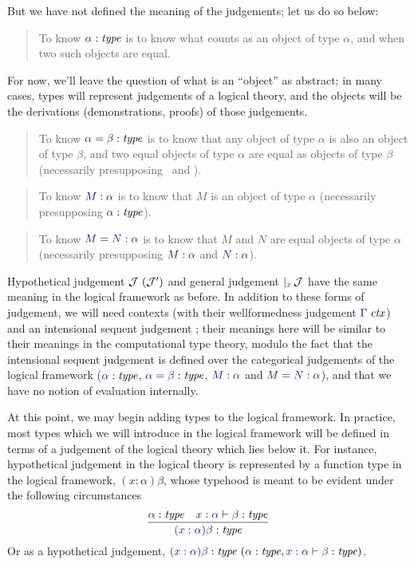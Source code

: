 \documentclass[main.tex]{subfiles}
\begin{document}
But we have not defined the meaning of the judgements; let us do so below:

\begin{quote}
  To know $\type\alpha$ is to know what counts as an object of type $\alpha$,
  and when two such objects are equal.
\end{quote}

For now, we'll leave the question of what is an ``object'' as
abstract; in many cases, types will represent judgements of a logical
theory, and the objects will be the derivations (demonstrations,
proofs) of those judgements.

\begin{quote}
  To know $\etype{\alpha}{\beta}$ is to know that any object of type $\alpha$ is
  also an object of type $\beta$, and two equal objects of type $\alpha$ are
  equal as objects of type $\beta$ (necessarily presupposing \type\alpha\ and
  \type\beta).
\end{quote}

\begin{quote}
  To know $\ofty{M}{\alpha}$ is to know that $M$ is an object of type $\alpha$
  (necessarily presupposing $\type\alpha$).
\end{quote}

\begin{quote}
  To know $\eofty{M}{N}{\alpha}$ is to know that $M$ and $N$ are equal objects of type
  $\alpha$ (necessarily presupposing $\ofty{M}{\alpha}$ and $\ofty{N}{\alpha}$).
\end{quote}

Hypothetical judgement $\mathcal{J}\ (\mathcal{J}')$ and general judgement
$\genj{x}{\mathcal{J}}$ have the same meaning in the logical framework as
before. In addition to these forms of judgement, we will need contexts (with
their wellformedness judgement $\isctx{\Gamma}$) and an intensional sequent
judgement ; their meanings here
will be similar to their meanings in the computational type theory, modulo the
fact that the intensional sequent judgement is defined over the categorical
judgements of the logical framework ($\type\alpha$, $\etype{\alpha}{\beta}$,
$\ofty{M}{\alpha}$ and $\eofty{M}{N}{\alpha}$), and that we have no notion of
evaluation internally.

At this point, we may begin adding types to the logical framework. In
practice, most types which we will introduce in the logical framework
will be defined in terms of a judgement of the logical theory which
lies below it.  For instance, hypothetical judgement in the logical
theory is represented by a function type in the logical framework,
$(x:\alpha)\beta$, whose typehood is meant to be evident under the
following circumstances
\[
  \infer{
    \type{(x:\alpha)\beta}
  }{
    \type\alpha &
    \lfsequent{x:\alpha}{\type\beta}
  }
\]
Or as a hypothetical judgement,
$\hyp{\type{(x:\alpha)\beta}}{\type\alpha,\lfsequent{x:\alpha}{\type\beta}}$.
\end{document}
